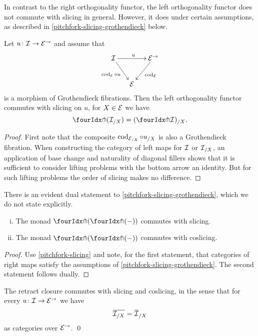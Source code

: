 \documentclass[reqno,10pt,a4paper,oneside,draft]{amsart}
\begin{document}
In contrast to the right orthogonality functor, the left orthogonality functor does not commute with slicing in general.
However, it does under certain assumptions, as described in \cref{pitchfork-slicing-grothendieck} below.

\begin{proposition} \label{pitchfork-slicing-grothendieck}
Let $u \co \cal{I} \to \cal{E}^\to$ and assume that
\[
\xymatrix@C-1em{
  \cal{I}
  \ar[rr]^{u}
  \ar[dr]_{\cod_{\cal{E}} \cc u}
&&
  \cal{E}^\to
  \ar[dl]^{\cod_{\cal{E}}}
\\&
  \cal{E}
}
\]
is a morphism of Grothendieck fibrations.
Then the left orthogonality functor commutes with slicing on $u$, \ie for $X \in \cal{E}$ we have
\[
  \liftl{(\cal{I}_{/X})} = (\liftl{\cal{I}})_{/X}
.\]
\end{proposition}

\begin{proof}
First note that the composite $\cod_{\cal{E}_{/X}} \cc u_{/X}$ is also a Grothendieck fibration.
When constructing the category of left maps for $\cal{I}$ or $\cal{I}_{/X}$, an 
application of base change and naturality of diagonal fillers shows that
it is sufficient  to consider lifting problems with the bottom arrow an identity.
But for such lifting problems the order of slicing makes no difference.
\end{proof}

There is an evident dual statement to \cref{pitchfork-slicing-grothendieck}, which we do not state explicitly.

\begin{corollary} \label{pitchfork-slicing-monad}
\leavevmode
\begin{enumerate}[(i)]
\item The monad $\liftl{(\liftr{(-)})}$ commutes with slicing.
\item The monad $\liftr{(\liftl{(-)})}$ commutes with coslicing.
\end{enumerate}
\end{corollary}

\begin{proof}
Use \cref{pitchfork-slicing} and note, for the first statement, that categories of right maps satisfy the assumptions of \cref{pitchfork-slicing-grothendieck}. The second statement
follows dually.
\end{proof}

\begin{proposition}
The retract closure commutes with slicing and coslicing, in the sense that for every $u \co \cal{I} \to \catE^\to$ we have
\[
  \overline{\cal{I}_{/X}} = \overline{\cal{I}}_{/X}
\]
as categories over $\catE^\to$.
\qed
\end{proposition}
\end{document}
